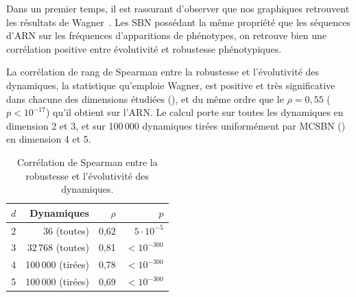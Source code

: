 \documentclass[12pt, a4paper]{article}
\begin{document}
Dans un premier temps, il est rassurant d'observer que nos graphiques retrouvent les résultats de Wagner~\cite{wagner2008}. Les SBN possédant la même propriété que les séquences d'ARN sur les fréquences d'apparitions de phénotypes, on retrouve bien une corrélation positive entre évolutivité et robustesse phénotypiques. 

La corrélation de rang de Spearman entre la robustesse et l'évolutivité des dynamiques, la statistique qu'emploie Wagner, est positive et très significative dans chacune des dimensions étudiées (), et du même ordre que le $\rho = 0{,}55$ ($p < 10^{-17}$) qu'il obtient sur l'ARN.
Le calcul porte sur toutes les dynamiques en dimension 2 et 3, et sur 100\,000 dynamiques tirées uniformément par MCSBN () en dimension 4 et 5.

\begin{table}[htbp]
\centering
\small
\caption{Corrélation de Spearman entre la robustesse et l'évolutivité des dynamiques.}
\label{tab:spearman}
\begin{tabular}{rrrr}
\toprule
$d$ & Dynamiques & $\rho$ & $p$ \\
\midrule
2 & 36 (toutes) & 0,62 & $5 \cdot 10^{-5}$ \\
3 & 32\,768 (toutes) & 0,81 & $< 10^{-300}$ \\
4 & 100\,000 (tirées) & 0,78 & $< 10^{-300}$ \\
5 & 100\,000 (tirées) & 0,69 & $< 10^{-300}$ \\
\bottomrule
\end{tabular}
\end{table}
\end{document}

